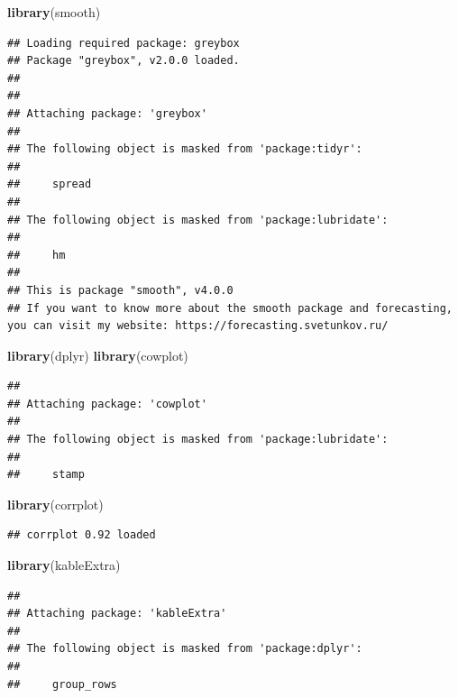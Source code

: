 \documentclass[
]{article}
\newenvironment{Shaded}{\begin{snugshade}}{\end{snugshade}}
\newcommand{\FunctionTok}[1]{\textcolor[rgb]{0.13,0.29,0.53}{\textbf{#1}}}
\newcommand{\NormalTok}[1]{#1}
\begin{document}
\begin{Shaded}
\begin{Highlighting}[]
\FunctionTok{library}\NormalTok{(smooth)}
\end{Highlighting}
\end{Shaded}

\begin{verbatim}
## Loading required package: greybox
## Package "greybox", v2.0.0 loaded.
## 
## 
## Attaching package: 'greybox'
## 
## The following object is masked from 'package:tidyr':
## 
##     spread
## 
## The following object is masked from 'package:lubridate':
## 
##     hm
## 
## This is package "smooth", v4.0.0
## If you want to know more about the smooth package and forecasting, you can visit my website: https://forecasting.svetunkov.ru/
\end{verbatim}

\begin{Shaded}
\begin{Highlighting}[]
\FunctionTok{library}\NormalTok{(dplyr)}
\FunctionTok{library}\NormalTok{(cowplot)}
\end{Highlighting}
\end{Shaded}

\begin{verbatim}
## 
## Attaching package: 'cowplot'
## 
## The following object is masked from 'package:lubridate':
## 
##     stamp
\end{verbatim}

\begin{Shaded}
\begin{Highlighting}[]
\FunctionTok{library}\NormalTok{(corrplot)}
\end{Highlighting}
\end{Shaded}

\begin{verbatim}
## corrplot 0.92 loaded
\end{verbatim}

\begin{Shaded}
\begin{Highlighting}[]
\FunctionTok{library}\NormalTok{(kableExtra)}
\end{Highlighting}
\end{Shaded}

\begin{verbatim}
## 
## Attaching package: 'kableExtra'
## 
## The following object is masked from 'package:dplyr':
## 
##     group_rows
\end{verbatim}
\end{document}
